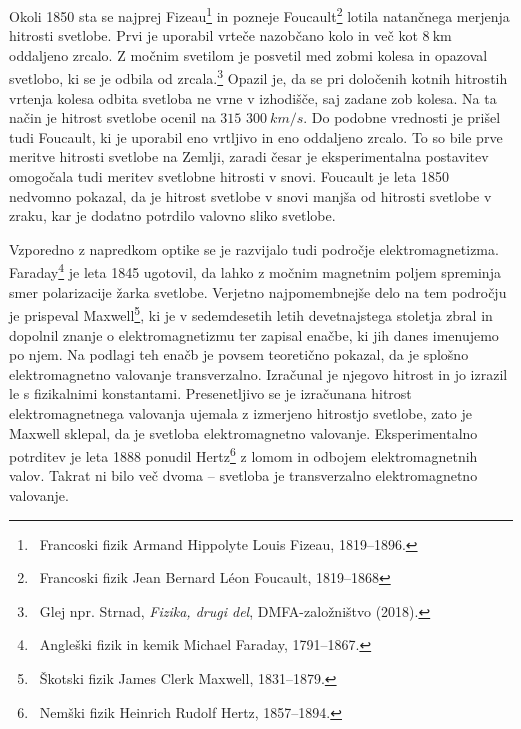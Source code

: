 Okoli 1850 sta se najprej Fizeau\footnote{~Francoski fizik Armand Hippolyte 
Louis Fizeau, 1819--1896.} in pozneje Foucault\footnote{~Francoski fizik
Jean Bernard L\'{e}on Foucault, 1819--1868} lotila natančnega 
merjenja hitrosti svetlobe. Prvi je uporabil vrteče nazobčano kolo 
in več kot $8~\si{\kilo\meter}$ oddaljeno zrcalo. Z močnim svetilom je posvetil med
zobmi kolesa in opazoval svetlobo, ki se je odbila od 
zrcala.\footnote{~Glej npr. Strnad, {\it Fizika, drugi del}, 
DMFA-založništvo (2018).} Opazil je, da se pri določenih kotnih hitrostih 
vrtenja kolesa odbita svetloba ne vrne v izhodišče, saj zadane zob kolesa. 
Na ta način je hitrost svetlobe ocenil na $315\,\,300~\si{km/s}$. Do podobne
vrednosti je prišel tudi Foucault, ki je uporabil eno vrtljivo in eno oddaljeno 
zrcalo. To so bile prve meritve hitrosti svetlobe na Zemlji, zaradi česar
je eksperimentalna postavitev omogočala tudi meritev 
svetlobne hitrosti v snovi. Foucault je leta 1850 nedvomno pokazal, 
da je hitrost svetlobe v snovi manjša od hitrosti svetlobe v zraku, kar je dodatno
potrdilo valovno sliko svetlobe. 

Vzporedno z napredkom optike se je razvijalo tudi področje
elektromagnetizma. Faraday\footnote{~Angleški fizik in kemik Michael Faraday, 1791--1867.} 
je leta 1845 ugotovil, da lahko z močnim magnetnim poljem spreminja
smer polarizacije žarka svetlobe. Verjetno najpomembnejše delo
na tem področju je prispeval Maxwell\footnote{~Škotski fizik James Clerk Maxwell, 
1831--1879.}, ki je v sedemdesetih letih devetnajstega stoletja
zbral in dopolnil znanje o elektromagnetizmu ter zapisal enačbe, ki jih 
danes imenujemo po njem. Na podlagi teh enačb je povsem 
teoretično pokazal, da je splošno elektromagnetno valovanje 
transverzalno. Izračunal je njegovo hitrost in jo
izrazil le s fizikalnimi konstantami. Presenetljivo se je izračunana 
hitrost elektromagnetnega valovanja ujemala 
z izmerjeno hitrostjo svetlobe, zato je Maxwell sklepal, da je svetloba 
elektromagnetno valovanje. Eksperimentalno potrditev je leta
1888 ponudil Hertz\footnote{~Nemški fizik 
Heinrich Rudolf Hertz, 1857--1894.} z lomom in odbojem elektromagnetnih 
valov. Takrat ni bilo več dvoma -- svetloba je transverzalno 
elektromagnetno valovanje. 

